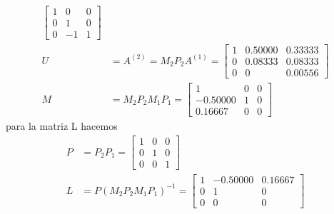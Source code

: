 \begin{enumerate}
\begin{align*}
		\begin{bmatrix}
			1 &0 &0 \\
			0 &1 &0 \\
			0 &-1 &1		
		\end{bmatrix}\\
		U &= A^{( 2 )} =M_2P_2A^{( 1 )} =
		\begin{bmatrix}
		1   &0.50000  & 0.33333\\
  		0   &0.08333   &0.08333\\
	    0   &0		   &0.00556
		\end{bmatrix}\\
		M &= M_2P_2M_1P_1=
		\begin{bmatrix}
			1   &0   &0\\
		  -0.50000   &1   &0\\
		   0.16667   &0   &0
		\end{bmatrix}
	\end{align*}
	para la matriz L hacemos
	\begin{align*}
		P &= P_2P_1=
		\begin{bmatrix}
			1 &0 &0\\
			0 &1 &0\\
			0 &0 &1
		\end{bmatrix}\\
		L &= P(M_2P_2M_1P_1)^{-1} =
		\begin{bmatrix}
			1  &-0.50000   &0.16667\\
		    0   &1   &0\\
		    0   &0   &0
		\end{bmatrix}
	\end{align*}
	

\end{enumerate}
